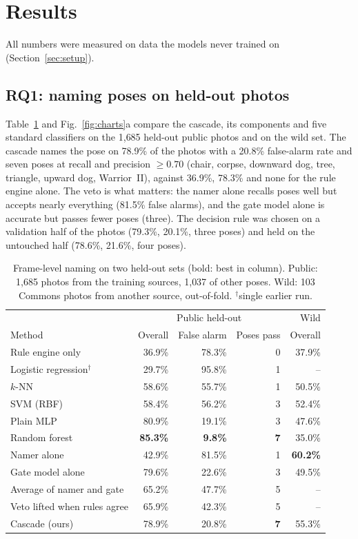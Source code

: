 \section{Results}\label{sec:results}
All numbers were measured on data the models never trained on (Section~\ref{sec:setup}).

\subsection{RQ1: naming poses on held-out photos}\label{sec:rq1}
Table~\ref{tab:frame} and Fig.~\ref{fig:charts}a compare the cascade, its components and five standard classifiers on the 1{,}685 held-out public photos and on the wild set. The cascade names the pose on 78.9\% of the photos with a 20.8\% false-alarm rate and seven poses at recall and precision $\ge0.70$ (chair, corpse, downward dog, tree, triangle, upward dog, Warrior~II), against 36.9\%, 78.3\% and none for the rule engine alone. The veto is what matters: the namer alone recalls poses well but accepts nearly everything (81.5\% false alarms), and the gate model alone is accurate but passes fewer poses (three). The decision rule was chosen on a validation half of the photos (79.3\%, 20.1\%, three poses) and held on the untouched half (78.6\%, 21.6\%, four poses).
\begin{table}[t]
\centering\footnotesize\setlength{\tabcolsep}{3.5pt}
\caption{Frame-level naming on two held-out sets (bold: best in column). Public: 1{,}685 photos from the training sources, 1{,}037 of other poses. Wild: 103 Commons photos from another source, out-of-fold. $^\dagger$single earlier run.}\label{tab:frame}
\begin{tabular}{@{}lrrrr@{}}
\toprule
 & \multicolumn{3}{c}{Public held-out} & Wild \\
Method & Overall & False alarm & Poses pass & Overall \\ \midrule
Rule engine only & 36.9\% & 78.3\% & 0 & 37.9\% \\
Logistic regression$^\dagger$ & 29.7\% & 95.8\% & 1 & -- \\
$k$-NN & 58.6\% & 55.7\% & 1 & 50.5\% \\
SVM (RBF) & 58.4\% & 56.2\% & 3 & 52.4\% \\
Plain MLP & 80.9\% & 19.1\% & 3 & 47.6\% \\
Random forest & \textbf{85.3\%} & \textbf{9.8\%} & \textbf{7} & 35.0\% \\
Namer alone & 42.9\% & 81.5\% & 1 & \textbf{60.2\%} \\
Gate model alone & 79.6\% & 22.6\% & 3 & 49.5\% \\
Average of namer and gate & 65.2\% & 47.7\% & 5 & -- \\
Veto lifted when rules agree & 65.9\% & 42.3\% & 5 & -- \\
Cascade (ours) & 78.9\% & 20.8\% & \textbf{7} & 55.3\% \\ \bottomrule
\end{tabular}
\end{table}

